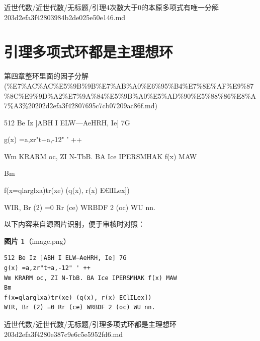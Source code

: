 \begin{note}[来源路径]

近世代数/近世代数/无标题/引理4次数大于0的本原多项式有唯一分解 203d2efa3f42803984b2de025e50e146.md

\end{note}

\section*{引理多项式环都是主理想环}

\begin{note}[来源上级主题]

第四章整环里面的因子分解 (\%E7\%AC\%AC\%E5\%9B\%9B\%E7\%AB\%A0\%E6\%95\%B4\%E7\%8E\%AF\%E9\%87\%8C\%E9\%9D\%A2\%E7\%9A\%84\%E5\%9B\%A0\%E5\%AD\%90\%E5\%88\%86\%E8\%A7\%A3\%20202d2efa3f42807695c7cb07209ac86f.md)

\end{note}

\begin{lemma}[引理多项式环都是主理想环]

512 Be Iz ]ABH I ELW—AeHRH, Ie] 7G

g(x) =a,zr"t+a,-12" ' ++

Wm KRARM oc, ZI N-TbB. BA Ice IPERSMHAK f(x) MAW

Bm

f(x=qlarglxa)tr(xe) (q(x), r(x) E€lILex])

WIR, Br (2) =0 Rr (ce) WRBDF 2 (oc) WU nn.

\end{lemma}

\begin{note}
以下内容来自源图片识别，便于审核时对照：

\textbf{图片 1}（image.png）
\begin{Verbatim}[fontsize=\small]
512 Be Iz ]ABH I ELW—AeHRH, Ie] 7G
g(x) =a,zr"t+a,-12" ' ++
Wm KRARM oc, ZI N-TbB. BA Ice IPERSMHAK f(x) MAW
Bm
f(x=qlarglxa)tr(xe) (q(x), r(x) E€lILex])
WIR, Br (2) =0 Rr (ce) WRBDF 2 (oc) WU nn.
\end{Verbatim}

\end{note}

\begin{note}[来源路径]

近世代数/近世代数/无标题/引理多项式环都是主理想环 203d2efa3f4280e387c9e6c5e5952fd6.md

\end{note}

